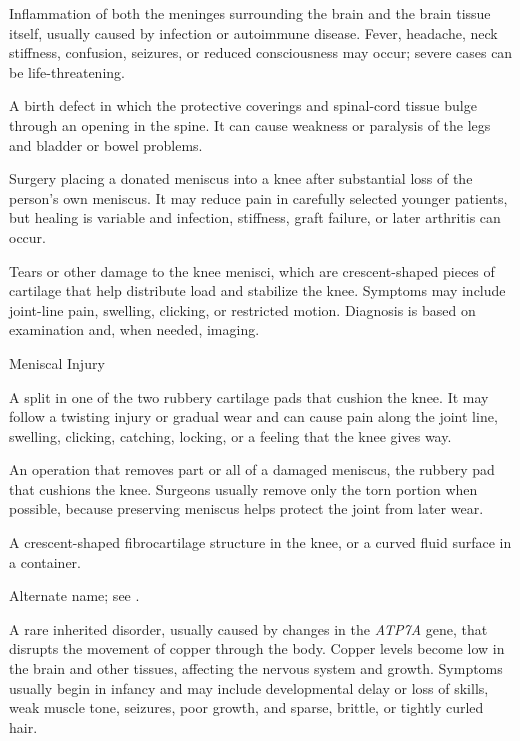  Inflammation of both the meninges surrounding the brain and the brain tissue itself, usually caused by
infection or autoimmune disease. Fever, headache, neck stiffness, confusion, seizures, or reduced
consciousness may occur; severe cases can be life-threatening.

 A birth defect in which the protective coverings and spinal-cord tissue bulge through an opening in the spine. It can cause weakness or paralysis of the legs and bladder or bowel problems.

 Surgery placing a donated meniscus into a knee after substantial loss of the person's own meniscus. It may reduce pain in carefully selected younger patients, but healing is variable and infection, stiffness, graft failure, or later arthritis can occur.

 Tears or other damage to the knee menisci, which are crescent-shaped pieces of cartilage
that help distribute load and stabilize the knee. Symptoms may include joint-line pain,
swelling, clicking, or restricted motion. Diagnosis is based on examination and, when needed, imaging.

\synonyms
Meniscal Injury

 A split in one of the two rubbery cartilage pads that cushion the knee. It may follow a twisting injury or gradual wear and can cause pain along the joint line, swelling, clicking, catching, locking, or a feeling that the knee gives way.

 An operation that removes part or all of a damaged meniscus, the rubbery pad that cushions the knee. Surgeons usually remove only the torn portion when possible, because preserving meniscus helps protect the joint from later wear.

 A crescent-shaped fibrocartilage structure in the knee, or a curved fluid surface in a container.

 Alternate name; see .

 A rare inherited disorder, usually caused by changes in the \textit{ATP7A} gene, that disrupts the movement of copper through the body. Copper levels become low in the brain and other tissues, affecting the nervous system and growth. Symptoms usually begin in infancy and may include developmental delay or loss of skills, weak muscle tone, seizures, poor growth, and sparse, brittle, or tightly curled hair.

